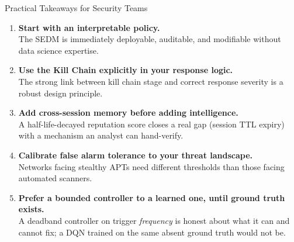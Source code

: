 \documentclass[aspectratio=169, 12pt]{beamer}
\begin{document}
\begin{frame}{Practical Takeaways for Security Teams}
  \begin{enumerate}
    \item \textbf{Start with an interpretable policy.}\\
          The SEDM is immediately deployable, auditable, and modifiable without data science expertise.

    \vspace{0.2cm}
    \item \textbf{Use the Kill Chain explicitly in your response logic.}\\
          The strong link between kill chain stage and correct response severity is a robust design principle.

    \vspace{0.2cm}
    \item \textbf{Add cross-session memory before adding intelligence.}\\
          A half-life-decayed reputation score closes a real gap (session TTL expiry) with a mechanism an analyst can hand-verify.

    \vspace{0.2cm}
    \item \textbf{Calibrate false alarm tolerance to your threat landscape.}\\
          Networks facing stealthy APTs need different thresholds than those facing automated scanners.

    \vspace{0.2cm}
    \item \textbf{Prefer a bounded controller to a learned one, until ground truth exists.}\\
          A deadband controller on trigger \emph{frequency} is honest about what it can and cannot fix; a DQN trained on the same absent ground truth would not be.
  \end{enumerate}
\end{frame}
\end{document}
